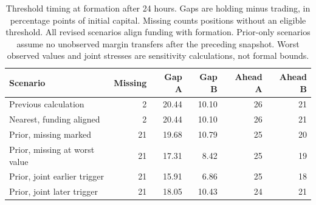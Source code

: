 \begin{table}[ht]
\centering\small
\caption{Threshold timing at formation after 24 hours. Gaps are holding minus trading, in percentage points of initial capital. Missing counts positions without an eligible threshold. All revised scenarios align funding with formation. Prior-only scenarios assume no unobserved margin transfers after the preceding snapshot. Worst observed values and joint stresses are sensitivity calculations, not formal bounds.}
\label{tab:thresholdtiming}
\begin{tabular}{lrrrrr}
\toprule
Scenario & Missing & Gap A & Gap B & Ahead A & Ahead B \\
\midrule
Previous calculation & 2 & 20.44 & 10.10 & 26 & 21 \\
Nearest, funding aligned & 2 & 20.44 & 10.10 & 26 & 21 \\
Prior, missing marked & 21 & 19.68 & 10.79 & 25 & 20 \\
Prior, missing at worst value & 21 & 17.31 & 8.42 & 25 & 19 \\
Prior, joint earlier trigger & 21 & 15.91 & 6.86 & 25 & 18 \\
Prior, joint later trigger & 21 & 18.05 & 10.43 & 24 & 21 \\
\bottomrule
\end{tabular}
\end{table}
